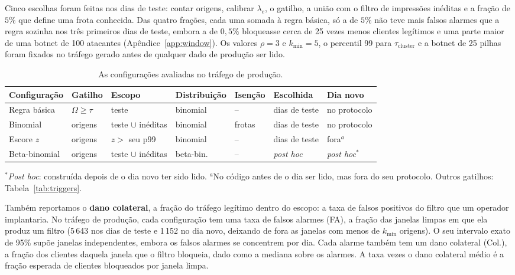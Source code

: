 \documentclass[conference,letterpaper,10pt]{IEEEtran}
\newcommand\1{\textit{(i)}}
\newcommand\2{\textit{(ii)}}
\newcommand\3{\textit{(iii)}}
\begin{document}
Cinco escolhas foram feitas nos dias de teste: contar origens, calibrar $\lambda_e$, o gatilho, a união com o filtro de impressões inéditas e a fração de $5\%$ que define uma frota conhecida. Das quatro frações, cada uma somada à regra básica, só a de $5\%$ não teve mais falsos alarmes que a regra sozinha nos três primeiros dias de teste, embora a de $0{,}5\%$ bloqueasse cerca de 25 vezes menos clientes legítimos e uma parte maior de uma botnet de 100 atacantes (Apêndice~\ref{app:window}). Os valores $\rho = 3$ e $k_{\min} = 5$, o percentil 99 para $\tau_{\mathrm{cluster}}$ e a botnet de 25 pilhas foram fixados no tráfego gerado antes de qualquer dado de produção ser lido.

\begin{table}[t]
\centering
\caption{As configurações avaliadas no tráfego de produção.}
\label{tab:configs}
\scriptsize
\setlength{\tabcolsep}{1.0pt}
\begin{tabular}{@{}lllllll@{}}
\toprule
\textbf{Configuração} & \textbf{Gatilho} & \textbf{Escopo} & \textbf{Distribuição} & \textbf{Isenção} & \textbf{Escolhida} & \textbf{Dia novo} \\
\midrule
Regra básica  & $\Omega \geq \tau$ & teste               & binomial  & --      & dias de teste & no protocolo \\
Binomial      & origens            & teste $\cup$ inéditas & binomial  & frotas  & dias de teste & no protocolo \\
Escore $z$    & origens            & $z >$ seu p99       & binomial  & --      & dias de teste & fora$^{a}$ \\
Beta-binomial & origens            & teste $\cup$ inéditas & beta-bin. & --      & \textit{post hoc} & \textit{post hoc}$^{*}$ \\
\bottomrule
\end{tabular}

\vspace{2pt}
{\footnotesize $^{*}$\textit{Post hoc}: construída depois de o dia novo ter sido lido. $^{a}$No código antes de o dia ser lido, mas fora do seu protocolo. Outros gatilhos: Tabela~\ref{tab:triggers}.}
\end{table}

Também reportamos o \textbf{dano colateral}, a fração do tráfego legítimo dentro do escopo: a taxa de falsos positivos do filtro que um operador implantaria. No tráfego de produção, cada configuração tem uma taxa de falsos alarmes (FA), a fração das janelas limpas em que ela produz um filtro (5\,643 nos dias de teste e 1\,152 no dia novo, deixando de fora as janelas com menos de $k_{\min}$ origens). O seu intervalo exato de 95\% supõe janelas independentes, embora os falsos alarmes se concentrem por dia. Cada alarme também tem um dano colateral (Col.), a fração dos clientes daquela janela que o filtro bloqueia, dado como a mediana sobre os alarmes. A taxa vezes o dano colateral médio é a fração esperada de clientes bloqueados por janela limpa.
\end{document}
